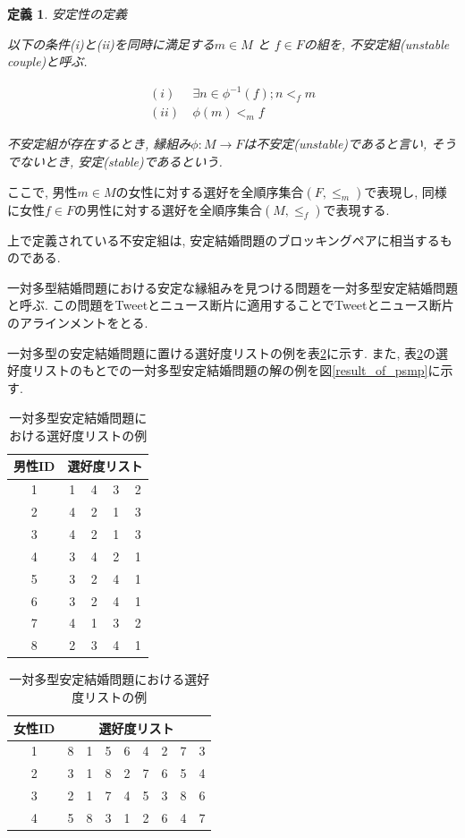 \documentclass[12pt]{jarticle}
\newtheorem{definittion}{定義}[section]
\begin{document}
\begin{definittion}
\label{psmp_def_2}
安定性の定義

以下の条件(i)と(ii)を同時に満足する$m \in M$ と $f \in F$の組を, 不安定組(unstable couple)と呼ぶ.

\begin{align}
(i) &\  \exists n \in \phi ^{-1} (f); n <_f m \\
(ii) &\  \phi(m) <_m f
\end{align}

不安定組が存在するとき, 縁組み$\phi: M \rightarrow F$は不安定(unstable)であると言い, そうでないとき, 安定(stable)であるという.
\end{definittion}

ここで, 男性$m \in M$の女性に対する選好を全順序集合$(F, \leq _m)$で表現し, 同様に女性$f \in F$の男性に対する選好を全順序集合$(M, \leq _f)$で表現する.

上で定義されている不安定組は, 安定結婚問題のブロッキングペアに相当するものである.

一対多型結婚問題における安定な縁組みを見つける問題を一対多型安定結婚問題と呼ぶ. この問題をTweetとニュース断片に適用することでTweetとニュース断片のアラインメントをとる.

一対多型の安定結婚問題に置ける選好度リストの例を表\ref{psmp_table}に示す.
また, 表\ref{psmp_table}の選好度リストのもとでの一対多型安定結婚問題の解の例を図\ref{result_of_psmp}に示す.

\begin{table}
\begin{center}
\caption{一対多型安定結婚問題における選好度リストの例}
\label{psmp_table}
\begin{tabular}[t]{|c||c|c|c|c|}
\hline
男性ID & \multicolumn{4}{|c|}{選好度リスト} \\ \hline \hline
1 & 1 & 4 & 3 & 2 \\ \hline
2 & 4 & 2 & 1 & 3 \\ \hline
3 & 4 & 2 & 1 & 3 \\ \hline
4 & 3 & 4 & 2 & 1 \\ \hline
5 & 3 & 2 & 4 & 1 \\ \hline
6 & 3 & 2 & 4 & 1 \\ \hline
7 & 4 & 1 & 3 & 2 \\ \hline
8 & 2 & 3 & 4 & 1 \\ \hline
\end{tabular}
\begin{tabular}[t]{|c||c|c|c|c|c|c|c|c|}
\hline
女性ID & \multicolumn{8}{|c|}{選好度リスト} \\ \hline \hline
1 & 8 & 1 & 5 & 6 & 4 & 2 & 7 & 3 \\ \hline
2 & 3 & 1 & 8 & 2 & 7 & 6 & 5 & 4 \\ \hline
3 & 2 & 1 & 7 & 4 & 5 & 3 & 8 & 6 \\ \hline
4 & 5 & 8 & 3 & 1 & 2 & 6 & 4 & 7 \\ \hline
\end{tabular}
\end{center}
\end{table}
\end{document}
